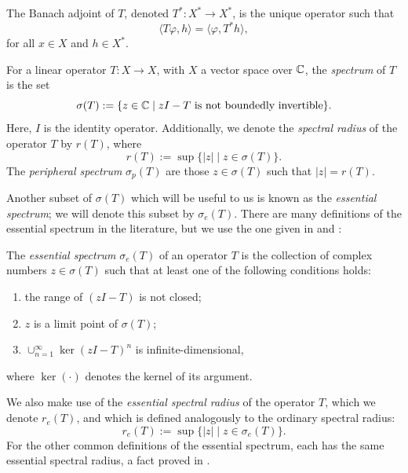The Banach adjoint of $T$, denoted $T^*:X^* \to X^*$, is the unique operator such that
\[\langle T \varphi, h \rangle = \langle \varphi, T^*h \rangle,\]
for all $x \in X$ and $h \in X^*$.

For a linear operator $T:X \to X$, with $X$ a vector space over $\mathbb{C}$, the \emph{spectrum} of $T$ is the set
\[\sigma(T) := \{z \in \mathbb{C} \mid z I- T \text{ is not boundedly invertible}\}.\]
Here, $I$ is the identity operator. Additionally, we denote the \emph{spectral radius} of the operator $T$ by $r(T)$, where
\[r(T) := \sup \{ |z| \mid z \in \sigma(T)\}.\]
The \emph{peripheral spectrum} $\sigma_p(T)$ are those $z \in \sigma(T)$ such that $|z| = r(T)$. 

Another subset of $\sigma(T)$ which will be useful to us is known as the \emph{essential spectrum}; we will denote this subset by $\sigma_e(T)$. There are many definitions of the essential spectrum in the literature, but we use the one given in \cite{Browder1961} and \cite{Edmunds1972}:

\begin{definition}
	The \emph{essential spectrum} $\sigma_e(T)$ of an operator $T$ is the collection of complex numbers $z \in \sigma(T)$ such that at least one of the following conditions holds:
	\begin{enumerate}
		\item the range of $(z I - T)$ is not closed;
		\item $z$ is a limit point of $\sigma(T)$;
		\item $\cup_{n=1}^\infty \ker (z I- T)^n$ is infinite-dimensional,
	\end{enumerate}
	where $\ker(\cdot)$ denotes the kernel of its argument.
\end{definition}

We also make use of the \emph{essential spectral radius} of the operator $T$, which we denote $r_e(T)$, and which is defined analogously to the ordinary spectral radius:
\[r_e(T) := \sup \{ |z| \mid z \in \sigma_e(T)\}.\]
For the other common definitions of the essential spectrum, each has the same essential spectral radius, a fact proved in \cite{Edmunds1987}.

